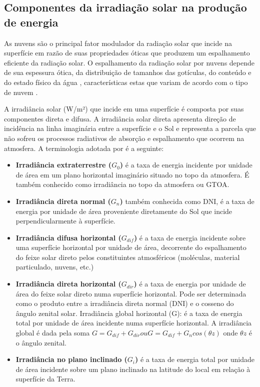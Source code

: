 \newpage
\subsection{Componentes da irradiação solar na produção de energia}

As nuvens são o principal fator modulador da radiação solar que incide na superfície em razão de suas propriedades óticas que produzem um espalhamento eficiente da radiação solar. O espalhamento da radiação solar por nuvens depende de sua espessura ótica, da distribuição de tamanhos das gotículas, do conteúdo e do estado físico da água \cite{PALTRIDGE}, características estas que variam de acordo com o tipo de nuvem \cite{atlas2017}.

A irradiância solar (W/m²) que incide em uma superfície é composta por suas componentes direta e difusa. A irradiância solar direta apresenta direção de incidência na linha imaginária entre a superfície e o Sol e representa a parcela que não sofreu os processos radiativos de absorção e espalhamento que ocorrem na atmosfera. A terminologia adotada por \cite{atlas2017} é a seguinte:

\begin{itemize}
  \item \textbf{Irradiância extraterrestre ($G_0$)} é a taxa de energia incidente por unidade de área em um plano horizontal imaginário situado no topo da atmosfera. É também conhecido como irradiância no topo da atmosfera ou GTOA.
  
  \item \textbf{Irradiância direta normal ($G_n$)} também conhecida como DNI, é a taxa de energia por unidade de área proveniente diretamente do Sol que incide perpendicularmente à superfície.
  
  \item \textbf{Irradiância difusa horizontal ($G_{dif}$)} é a taxa de energia incidente sobre uma superfície horizontal por unidade de área, decorrente do espalhamento do feixe solar direto pelos constituintes atmosféricos (moléculas, material particulado, nuvens, etc.)
  
  \item \textbf{Irradiância direta horizontal ($G_{dir}$)} é a taxa de energia por unidade de área do feixe solar direto numa superfície horizontal. Pode ser determinada como o produto entre a irradiância direta normal (DNI) e o cosseno do ângulo zenital solar. Irradiância global horizontal (G): é a taxa de energia total por unidade de área incidente numa superfície horizontal. A irradiância global é dada pela soma $G = G_{dif} + G_{dir} ou G = G_{dif} + G_n cos(\theta z)$ onde $\theta z$ é o ângulo zenital.

  \item \textbf{Irradiância no plano inclinado ($G_{i}$)} é a taxa de energia total por unidade de área incidente sobre um plano inclinado na latitude do local em relação à superfície da Terra.

\end{itemize}


